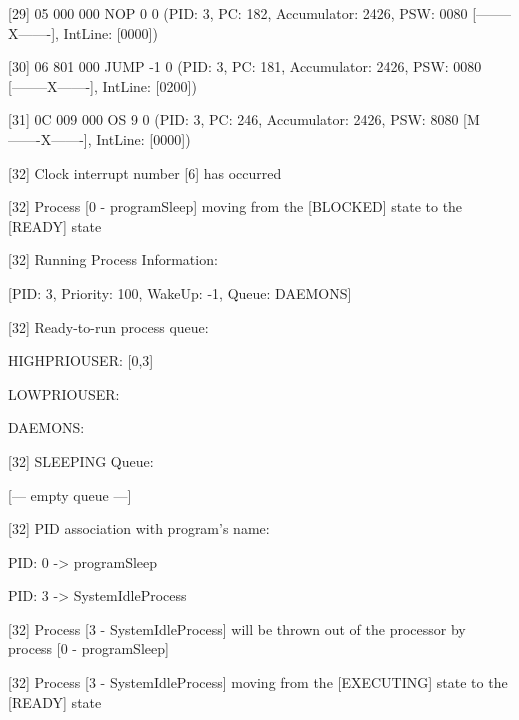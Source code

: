 [\textcolor{termred}{29}] {05 000 000} NOP 0 0 (PID: \textcolor{termgreen}{3}, PC: \textcolor{termred}{182}, Accumulator: \textcolor{termred}{2426}, PSW: \textcolor{termred}{0080} [\textcolor{termred}{--------X-------}], IntLine: [\textcolor{termred}{0000}])

[\textcolor{termred}{30}] {06 801 000} JUMP -1 0 (PID: \textcolor{termgreen}{3}, PC: \textcolor{termred}{181}, Accumulator: \textcolor{termred}{2426}, PSW: \textcolor{termred}{0080} [\textcolor{termred}{--------X-------}], IntLine: [\textcolor{termred}{0200}])

[\textcolor{termred}{31}] {0C 009 000} OS 9 0 (PID: \textcolor{termgreen}{3}, PC: \textcolor{termred}{246}, Accumulator: \textcolor{termred}{2426}, PSW: \textcolor{termred}{8080} [\textcolor{termred}{M-------X-------}], IntLine: [\textcolor{termred}{0000}])

	[\textcolor{termred}{32}] \textcolor{termcyan}{Clock interrupt number [6] has occurred}

	[\textcolor{termred}{32}] Process [\textcolor{termgreen}{0} - \textcolor{termgreen}{programSleep}] moving from the [\textcolor{termgreen}{BLOCKED}] state to the [\textcolor{termgreen}{READY}] state

	[\textcolor{termred}{32}] Running Process Information:

		[PID: \textcolor{termgreen}{3}, Priority: 100, WakeUp: \textcolor{termred}{-1}, Queue: DAEMONS]

	[\textcolor{termred}{32}] Ready-to-run process queue:

 		HIGHPRIOUSER: [\textcolor{termgreen}{0},3]

		LOWPRIOUSER: 

		DAEMONS: 

	[\textcolor{termred}{32}] SLEEPING Queue:

		[--- empty queue ---]

	[\textcolor{termred}{32}] PID association with program's name:

		PID: \textcolor{termgreen}{0} -> programSleep

		PID: \textcolor{termgreen}{3} -> SystemIdleProcess

	[\textcolor{termred}{32}] Process [\textcolor{termgreen}{3} - \textcolor{termgreen}{SystemIdleProcess}] will be thrown out of the processor by process [\textcolor{termgreen}{0} - \textcolor{termgreen}{programSleep}]

	[\textcolor{termred}{32}] Process [\textcolor{termgreen}{3} - \textcolor{termgreen}{SystemIdleProcess}] moving from the [\textcolor{termgreen}{EXECUTING}] state to the [\textcolor{termgreen}{READY}] state

